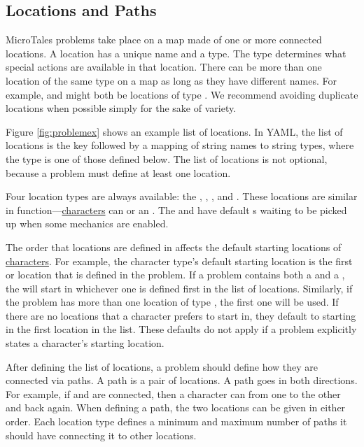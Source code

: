 \documentclass{nilreport}
\begin{document}
\newpage

\subsection{Locations and Paths} \label{sec:locations}

MicroTales problems take place on a map made of one or more connected locations. A location has a unique name and a type. The type determines what special actions are available in that location. There can be more than one location of the same type on a map as long as they have different names. For example,  and  might both be locations of type . We recommend avoiding duplicate locations when possible simply for the sake of variety.

Figure \ref{fig:problemex} shows an example list of locations. In YAML, the list of locations is the key  followed by a mapping of string names to string types, where the type is one of those defined below. The list of locations is not optional, because a problem must define at least one location.

Four location types are always available: the , , , and . These locations are similar in function---\hyperref[sec:characters]{characters} can  or  an . The  and  have default s waiting to be picked up when some mechanics are enabled.

The order that locations are defined in affects the default starting locations of \hyperref[sec:characters]{characters}. For example, the  character type's default starting location is the first  or  location that is defined in the problem. If a problem contains both a  and a , the  will start in whichever one is defined first in the list of locations. Similarly, if the problem has more than one location of type , the first one will be used. If there are no locations that a character prefers to start in, they default to starting in the first location in the list. These defaults do not apply if a problem explicitly states a character's starting location.

After defining the list of locations, a problem should define how they are connected via paths. A path is a pair of locations. A path goes in both directions. For example, if  and  are connected, then a character can  from one to the other and back again. When defining a path, the two locations can be given in either order. Each location type defines a minimum and maximum number of paths it should have connecting it to other locations.
\end{document}
